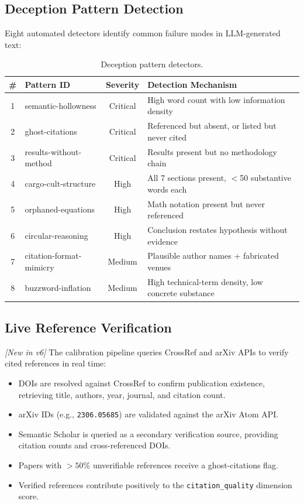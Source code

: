 \documentclass[11pt,a4paper]{article}
\theoremstyle{plain}
\theoremstyle{definition}
\theoremstyle{remark}
\begin{document}
\subsection{Deception Pattern Detection}
\label{sec:deception}

Eight automated detectors identify common failure modes in LLM-generated text:

\begin{table}[ht]
\centering
\caption{Deception pattern detectors.}
\label{tab:deception}
\small\begin{tabular}{@{}clcp{6cm}@{}}
\toprule
\textbf{\#} & \textbf{Pattern ID} & \textbf{Severity} & \textbf{Detection Mechanism} \\
\midrule
1 & semantic-hollowness   & Critical  & High word count with low information density \\
2 & ghost-citations       & Critical  & Referenced but absent, or listed but never cited \\
3 & results-without-method& Critical  & Results present but no methodology chain \\
4 & cargo-cult-structure  & High      & All 7 sections present, $<$50 substantive words each \\
5 & orphaned-equations    & High      & Math notation present but never referenced \\
6 & circular-reasoning    & High      & Conclusion restates hypothesis without evidence \\
7 & citation-format-mimicry& Medium   & Plausible author names + fabricated venues \\
8 & buzzword-inflation    & Medium    & High technical-term density, low concrete substance \\
\bottomrule
\end{tabular}
\end{table}

\subsection{Live Reference Verification}

\emph{[New in v6]} The calibration pipeline queries CrossRef and arXiv APIs to verify cited
references in real time:
\begin{itemize}
  \item DOIs are resolved against CrossRef to confirm publication existence, retrieving title,
    authors, year, journal, and citation count.
  \item arXiv IDs (e.g., \texttt{2306.05685}) are validated against the arXiv Atom API.
  \item Semantic Scholar is queried as a secondary verification source, providing citation counts
    and cross-referenced DOIs.
  \item Papers with $> 50\%$ unverifiable references receive a ghost-citations flag.
  \item Verified references contribute positively to the \texttt{citation\_quality} dimension score.
\end{itemize}
\end{document}
